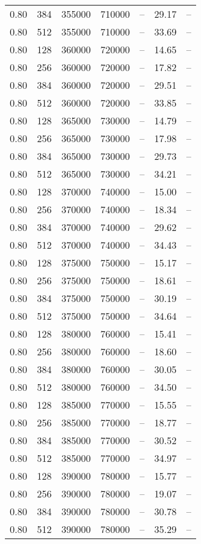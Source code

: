 \begin{tabular}{l|l|l|l|l|l|l}
0.80 & 384 & 355000 & 710000 & -- & 29.17 & --\\
0.80 & 512 & 355000 & 710000 & -- & 33.69 & --\\
0.80 & 128 & 360000 & 720000 & -- & 14.65 & --\\
0.80 & 256 & 360000 & 720000 & -- & 17.82 & --\\
0.80 & 384 & 360000 & 720000 & -- & 29.51 & --\\
0.80 & 512 & 360000 & 720000 & -- & 33.85 & --\\
0.80 & 128 & 365000 & 730000 & -- & 14.79 & --\\
0.80 & 256 & 365000 & 730000 & -- & 17.98 & --\\
0.80 & 384 & 365000 & 730000 & -- & 29.73 & --\\
0.80 & 512 & 365000 & 730000 & -- & 34.21 & --\\
0.80 & 128 & 370000 & 740000 & -- & 15.00 & --\\
0.80 & 256 & 370000 & 740000 & -- & 18.34 & --\\
0.80 & 384 & 370000 & 740000 & -- & 29.62 & --\\
0.80 & 512 & 370000 & 740000 & -- & 34.43 & --\\
0.80 & 128 & 375000 & 750000 & -- & 15.17 & --\\
0.80 & 256 & 375000 & 750000 & -- & 18.61 & --\\
0.80 & 384 & 375000 & 750000 & -- & 30.19 & --\\
0.80 & 512 & 375000 & 750000 & -- & 34.64 & --\\
0.80 & 128 & 380000 & 760000 & -- & 15.41 & --\\
0.80 & 256 & 380000 & 760000 & -- & 18.60 & --\\
0.80 & 384 & 380000 & 760000 & -- & 30.05 & --\\
0.80 & 512 & 380000 & 760000 & -- & 34.50 & --\\
0.80 & 128 & 385000 & 770000 & -- & 15.55 & --\\
0.80 & 256 & 385000 & 770000 & -- & 18.77 & --\\
0.80 & 384 & 385000 & 770000 & -- & 30.52 & --\\
0.80 & 512 & 385000 & 770000 & -- & 34.97 & --\\
0.80 & 128 & 390000 & 780000 & -- & 15.77 & --\\
0.80 & 256 & 390000 & 780000 & -- & 19.07 & --\\
0.80 & 384 & 390000 & 780000 & -- & 30.78 & --\\
0.80 & 512 & 390000 & 780000 & -- & 35.29 & --\\

\end{tabular}
